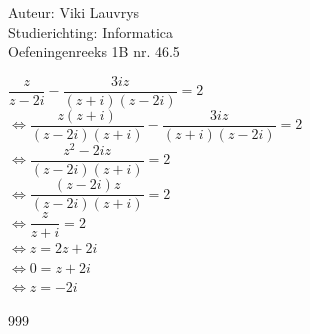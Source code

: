\documentclass[a4paper]{article}
\begin{document}
  
\noindent \large Auteur: Viki Lauvrys        \\
\noindent \large Studierichting: Informatica \\
\noindent \large Oefeningenreeks 1B nr. 46.5 \\

\medskip

\normalsize

$ \dfrac{z}{z - 2i} - \dfrac{3iz}{(z +i)(z -2i)} = 2 $ \\

$ \Leftrightarrow \dfrac{z (z +i)}{(z - 2i) (z +i)} - \dfrac{3iz}{(z +i)(z -2i)} = 2 $ \\

$ \Leftrightarrow \dfrac{z^2 -2iz}{(z -2i)(z +i)} = 2 $ \\

$ \Leftrightarrow \dfrac{(z -2i)z}{(z -2i)(z +i)} = 2 $ \\

$ \Leftrightarrow \dfrac{z}{z +i} = 2 $ \\

$ \Leftrightarrow z = 2z +2i $ \\

$ \Leftrightarrow 0 = z +2i $ \\

$ \Leftrightarrow z = -2i $ \\

\begin{thebibliography}{999}
\end{thebibliography}
\end{document}
